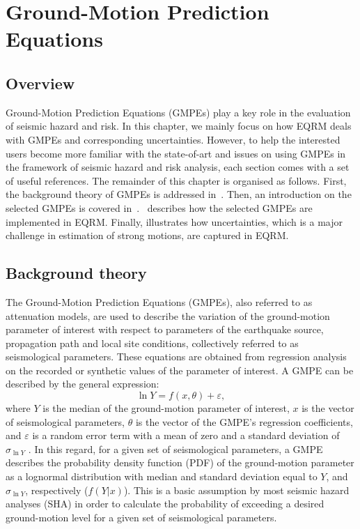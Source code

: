 \chapter{Ground-Motion Prediction Equations}
\label{ch:atten}

\newcommand{\Rhyp}{R_{\mathrm{hyp}}}
\newcommand{\Repi}{R_{\mathrm{epi}}}
\newcommand{\Rrup}{R_{\mathrm{rup}}}
\newcommand{\Rjb}{R_{\mathrm{jb}}}

\section{Overview}

Ground-Motion Prediction Equations (GMPEs) play a key role in the
evaluation of seismic hazard and risk. In this chapter, we mainly
focus on how EQRM deals with GMPEs and corresponding uncertainties.
However, to help the interested users become more familiar with the
state-of-art and issues on using GMPEs in the framework of seismic
hazard and risk analysis, each section comes with a set of useful
references. The remainder of this chapter is organised as follows.
First, the background theory of GMPEs is addressed
in~. Then, an introduction on the selected
GMPEs is covered
in~.~ describes how
the selected GMPEs are implemented in EQRM. Finally,
 illustrates how uncertainties, which is a major
challenge in estimation of strong motions, are captured in EQRM.



\section{Background theory} \label{sec:background} The
Ground-Motion Prediction Equations (GMPEs), also referred to as
attenuation models, are used to describe the variation of the
ground-motion parameter of interest with respect to parameters of
the earthquake source, propagation path and local site conditions,
collectively referred to as seismological parameters. These
equations are obtained from regression analysis on the recorded or
synthetic values of the parameter of interest. A GMPE can be
described by the general expression:
\begin{equation}\label{eq:general}
\ln Y =f(x,\theta)+\varepsilon,
\end{equation}
where $Y$ is the median of the ground-motion parameter of interest,
$x$ is the vector of seismological parameters, $\theta$ is the
vector of the GMPE’s regression coefficients, and $\varepsilon$ is
a random error term with a mean of zero and a standard deviation of
$\sigma_{\ln Y}$ . In this regard, for a given set of seismological
parameters, a GMPE describes the probability density function (PDF)
of the ground-motion parameter as a lognormal distribution with
median and standard deviation equal to $Y$, and  $\sigma_{\ln Y}$,
respectively ($f(Y|x)$). This is a basic assumption by most seismic
hazard analyses (SHA) in order to calculate the probability of
exceeding a desired ground-motion level for a given set of
seismological parameters.

